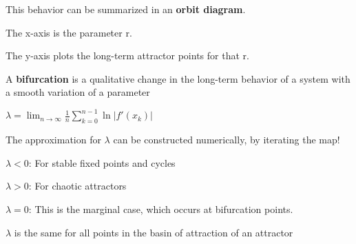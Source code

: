This behavior can be summarized in an \textbf{orbit diagram}.
\begin{tightitemize}
    \item The x-axis is the parameter r.
    \item The y-axis plots the long-term attractor points for that r.
\end{tightitemize}    

A \textbf{bifurcation} is a qualitative change in the long-term behavior
of a system with a smooth variation of a parameter
    
$\lambda = \lim_{n \to \infty} \frac{1}{n} \sum_{k=0}^{n-1} \ln|f'(x_k)|$

The approximation for $\lambda$ can be constructed numerically, by iterating the map!
\begin{tightitemize}
    \item $\lambda < 0$: For stable fixed points and cycles
    \item $\lambda > 0$: For chaotic attractors
    \item $\lambda = 0$: This is the marginal case, which occurs at bifurcation points.
    \item $\lambda$ is the same for all points in the basin of attraction of an attractor
\end{tightitemize} 
    

